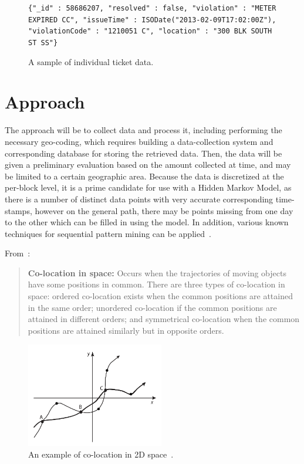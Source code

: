 \documentclass[conference]{IEEEtran}
\begin{document}
\begin{figure}[h]
\small{\texttt{\{"\_id" : 58686207, "resolved" : false, "violation" : "METER
EXPIRED CC", "issueTime" : ISODate("2013-02-09T17:02:00Z"), "violationCode" :
"1210051 C", "location" : "300 BLK SOUTH ST SS"\}}
\caption{A sample of individual ticket data.}}
\end{figure}

\section{Approach}
\label{sec:approach}
The approach will be to collect data and process it, including performing the
necessary geo-coding, which requires building a data-collection system and
corresponding database for storing the retrieved data. Then, the data will be
given a preliminary evaluation based on the amount collected at time, and may be
limited to a certain geographic area. Because the data is discretized at the
per-block level, it is a prime candidate for use with a Hidden Markov Model, as
there is a number of distinct data points with very accurate corresponding
time-stamps, however on the general path, there may be points missing from one
day to the other which can be filled in using the model. In addition, various
known techniques for sequential pattern mining can be
applied~\cite{Agrawal95miningsequential}.

From~\cite{Dodge:2008:TTM:1594710.1594716}:
\blockquote{\textbf{Co-location in space:} Occurs when the trajectories of
moving objects have some positions in common. There are three types of
co-location in space: ordered co-location exists when the common positions are
attained in the same order; unordered co-location if the common positions are
attained in different orders; and symmetrical co-location when the common
positions are attained similarly but in opposite orders.}

\begin{figure}
\centering
\includegraphics[width=60mm]{refs/coloc.png}
\caption{An example of co-location in 2D
space~\cite{Dodge:2008:TTM:1594710.1594716}.}
\end{figure}
\end{document}
